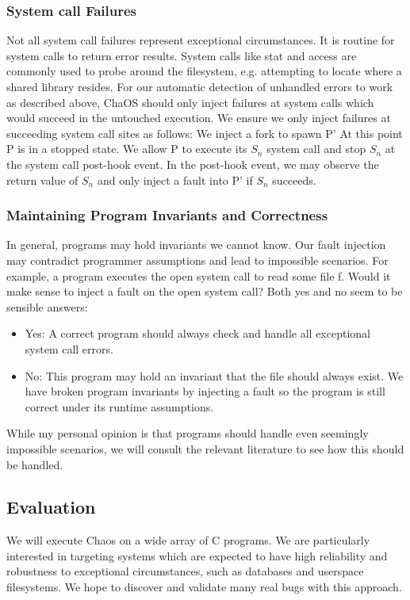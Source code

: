 \subsubsection{System call Failures}
\label{syscallfailures}
Not all system call failures represent exceptional circumstances. It is routine for system calls to return error results. System calls like stat and access are commonly used to probe around the filesystem, e.g. attempting to locate where a shared library resides.
For our automatic detection of unhandled errors to work as described above, ChaOS should only inject failures at system calls which would succeed in the untouched execution. We ensure we only inject failures at succeeding system call sites as follows: 
We inject a fork to spawn P’
At this point P is in a stopped state.
We allow P to execute its $S_n$ system call and stop $S_n$ at the system call post-hook event. In the post-hook event, we may observe the return value of $S_n$ and only inject a fault into P’ if $S_n$ succeeds.

\subsubsection{Maintaining Program Invariants and Correctness}
In general, programs may hold invariants we cannot know. Our fault injection may contradict programmer assumptions and lead to impossible scenarios. For example, a program executes the open system call to read some file f. Would it make sense to inject a fault on the open system call? Both yes and no seem to be sensible answers:
\begin{itemize}
\item Yes: A correct program should always check and handle all exceptional system call errors.
\item No: This program may hold an invariant that the file should always exist. We have broken program invariants by injecting a fault so the program is still correct under its runtime assumptions.
\end{itemize}
While my personal opinion is that programs should handle even seemingly impossible scenarios, we will consult the relevant literature to see how this should be handled.

\subsection{Evaluation}
We will execute Chaos on a wide array of C programs. We are particularly interested in targeting systems which are expected to have high reliability and robustness to exceptional circumstances, such as databases and userspace filesystems. We hope to discover and validate many real bugs with this approach.
